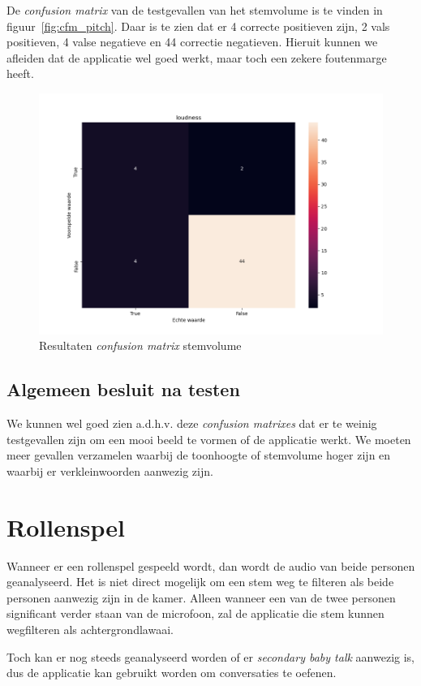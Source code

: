 De \textit{confusion matrix} van de testgevallen van het stemvolume is te vinden in figuur~\ref{fig:cfm_pitch}. Daar is te zien dat er 4 correcte positieven zijn, 2 vals positieven, 4 valse negatieve en 44 correctie negatieven.
Hieruit kunnen we afleiden dat de applicatie wel goed werkt, maar toch een zekere foutenmarge heeft.
\begin{figure}
	\centering
	\includegraphics[width=1\textwidth]{./img/cfm_loudness}
	\caption{\label{fig:cfm_loudness} Resultaten \textit{confusion matrix} stemvolume}
\end{figure}

\subsection{Algemeen besluit na testen}
We kunnen wel goed zien a.d.h.v. deze \textit{confusion matrixes} dat er te weinig testgevallen zijn om een mooi beeld te vormen of de applicatie werkt. We moeten meer gevallen verzamelen waarbij de toonhoogte of stemvolume hoger zijn en waarbij er verkleinwoorden aanwezig zijn.

\section{Rollenspel}
Wanneer er een rollenspel gespeeld wordt, dan wordt de audio van beide personen geanalyseerd. Het is niet direct mogelijk om een stem weg te filteren als beide personen aanwezig zijn in de kamer. Alleen wanneer een van de twee personen significant verder staan van de microfoon, zal de applicatie die stem kunnen wegfilteren als achtergrondlawaai.

Toch kan er nog steeds geanalyseerd worden of er \textit{secondary baby talk} aanwezig is, dus de applicatie kan gebruikt worden om conversaties te oefenen.

